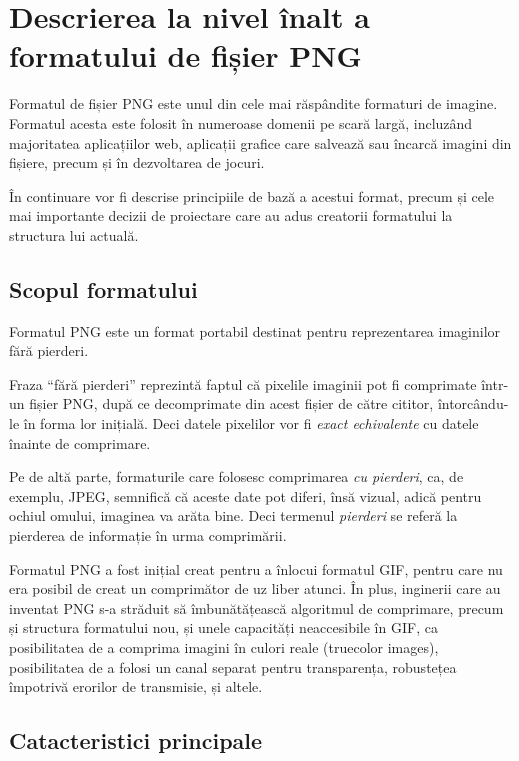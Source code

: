 \documentclass[a4paper,12pt]{report}
\begin{document}
\section{Descrierea la nivel înalt a formatului de fișier \ac{PNG}}

Formatul de fișier \ac{PNG} este unul din cele mai răspândite formaturi de imagine.
Formatul acesta este folosit în numeroase domenii pe scară largă, incluzând majoritatea aplicațiilor
web, aplicații grafice care salvează sau încarcă imagini din fișiere, precum și în dezvoltarea de jocuri.

În continuare vor fi descrise principiile de bază a acestui format,
precum și cele mai importante decizii de proiectare care au adus creatorii formatului la structura lui actuală.

\subsection{Scopul formatului}

Formatul \ac{PNG} este un format portabil destinat pentru reprezentarea imaginilor fără pierderi.

Fraza ``fără pierderi'' reprezintă faptul că pixelile imaginii
pot fi comprimate într-un fișier \ac{PNG},
după ce decomprimate din acest fișier de către cititor,
întorcându-le în forma lor inițială.
Deci datele pixelilor vor fi \textit{exact echivalente} cu datele înainte de comprimare.

Pe de altă parte, formaturile care folosesc comprimarea \textit{cu pierderi},
ca, de exemplu, \ac{JPEG}, semnifică că aceste date pot diferi,
însă vizual, adică pentru ochiul omului, imaginea va arăta bine.
Deci termenul \textit{pierderi} se referă la pierderea de informație în urma comprimării.

Formatul \ac{PNG} a fost inițial creat pentru a înlocui formatul \ac{GIF},
pentru care nu era posibil de creat un comprimător de uz liber atunci\cite{gif_unusable_reason}.
În plus, inginerii care au inventat \ac{PNG} s-a străduit să îmbunătățească algoritmul de comprimare,
precum și structura formatului nou, și unele capacități neaccesibile în \ac{GIF},
ca posibilitatea de a comprima imagini în culori reale (truecolor images),
posibilitatea de a folosi un canal separat pentru transparența,
robustețea împotrivă erorilor de transmisie, și altele.

\subsection{Catacteristici principale}
\end{document}

